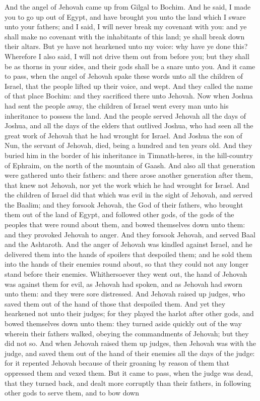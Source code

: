 And the angel of Jehovah came up from Gilgal to Bochim. And he said, I made you to go up out of Egypt, and have brought you unto the land which I sware unto your fathers; and I said, I will never break my covenant with you: and ye shall make no covenant with the inhabitants of this land; ye shall break down their altars. But ye have not hearkened unto my voice: why have ye done this? Wherefore I also said, I will not drive them out from before you; but they shall be as thorns in your sides, and their gods shall be a snare unto you. And it came to pass, when the angel of Jehovah spake these words unto all the children of Israel, that the people lifted up their voice, and wept. And they called the name of that place Bochim: and they sacrificed there unto Jehovah.  Now when Joshua had sent the people away, the children of Israel went every man unto his inheritance to possess the land. And the people served Jehovah all the days of Joshua, and all the days of the elders that outlived Joshua, who had seen all the great work of Jehovah that he had wrought for Israel. And Joshua the son of Nun, the servant of Jehovah, died, being a hundred and ten years old. And they buried him in the border of his inheritance in Timnath-heres, in the hill-country of Ephraim, on the north of the mountain of Gaash. And also all that generation were gathered unto their fathers: and there arose another generation after them, that knew not Jehovah, nor yet the work which he had wrought for Israel.  And the children of Israel did that which was evil in the sight of Jehovah, and served the Baalim; and they forsook Jehovah, the God of their fathers, who brought them out of the land of Egypt, and followed other gods, of the gods of the peoples that were round about them, and bowed themselves down unto them: and they provoked Jehovah to anger. And they forsook Jehovah, and served Baal and the Ashtaroth. And the anger of Jehovah was kindled against Israel, and he delivered them into the hands of spoilers that despoiled them; and he sold them into the hands of their enemies round about, so that they could not any longer stand before their enemies. Whithersoever they went out, the hand of Jehovah was against them for evil, as Jehovah had spoken, and as Jehovah had sworn unto them: and they were sore distressed.  And Jehovah raised up judges, who saved them out of the hand of those that despoiled them. And yet they hearkened not unto their judges; for they played the harlot after other gods, and bowed themselves down unto them: they turned aside quickly out of the way wherein their fathers walked, obeying the commandments of Jehovah; but they did not so. And when Jehovah raised them up judges, then Jehovah was with the judge, and saved them out of the hand of their enemies all the days of the judge: for it repented Jehovah because of their groaning by reason of them that oppressed them and vexed them. But it came to pass, when the judge was dead, that they turned back, and dealt more corruptly than their fathers, in following other gods to serve them, and to bow down 